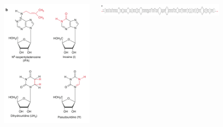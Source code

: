 \documentclass[11pt,ignorenonframetext,aspectratio=169]{beamer}
\begin{document}
\begin{frame}{}
\begin{figure}
\begin{columns}[T,onlytextwidth]
\begin{columns}[T,onlytextwidth]
  \begin{center}
  \includegraphics[width=0.95\linewidth]{../images/ribonucleic_acids_types.png}
  \end{center}
  \end{columns}
  
  \begin{center}
  \includegraphics[width=0.95\linewidth]{../images/ribonucleic_acids_viral_molecule.png}
  \end{center}


\end{columns}
\end{figure}
\end{frame}
\end{document}
